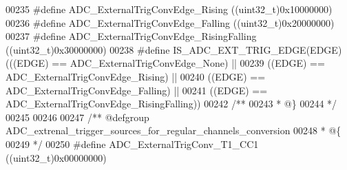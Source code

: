 \begin{DoxyCode}
00235 \textcolor{preprocessor}{#}\textcolor{preprocessor}{define} \textcolor{preprocessor}{ADC\_ExternalTrigConvEdge\_Rising}        \textcolor{preprocessor}{(}\textcolor{preprocessor}{(}\textcolor{preprocessor}{uint32\_t}\textcolor{preprocessor}{)}0x10000000\textcolor{preprocessor}{)}
00236 \textcolor{preprocessor}{#}\textcolor{preprocessor}{define} \textcolor{preprocessor}{ADC\_ExternalTrigConvEdge\_Falling}       \textcolor{preprocessor}{(}\textcolor{preprocessor}{(}\textcolor{preprocessor}{uint32\_t}\textcolor{preprocessor}{)}0x20000000\textcolor{preprocessor}{)}
00237 \textcolor{preprocessor}{#}\textcolor{preprocessor}{define} \textcolor{preprocessor}{ADC\_ExternalTrigConvEdge\_RisingFalling} \textcolor{preprocessor}{(}\textcolor{preprocessor}{(}\textcolor{preprocessor}{uint32\_t}\textcolor{preprocessor}{)}0x30000000\textcolor{preprocessor}{)}
00238 \textcolor{preprocessor}{#}\textcolor{preprocessor}{define} \textcolor{preprocessor}{IS\_ADC\_EXT\_TRIG\_EDGE}\textcolor{preprocessor}{(}\textcolor{preprocessor}{EDGE}\textcolor{preprocessor}{)} \textcolor{preprocessor}{(}\textcolor{preprocessor}{(}\textcolor{preprocessor}{(}\textcolor{preprocessor}{EDGE}\textcolor{preprocessor}{)} \textcolor{preprocessor}{==} 
      ADC_ExternalTrigConvEdge_None\textcolor{preprocessor}{)} \textcolor{preprocessor}{||}
00239                              \textcolor{preprocessor}{(}\textcolor{preprocessor}{(}\textcolor{preprocessor}{EDGE}\textcolor{preprocessor}{)} \textcolor{preprocessor}{==} ADC_ExternalTrigConvEdge_Rising\textcolor{preprocessor}{)} \textcolor{preprocessor}{||}
00240                              \textcolor{preprocessor}{(}\textcolor{preprocessor}{(}\textcolor{preprocessor}{EDGE}\textcolor{preprocessor}{)} \textcolor{preprocessor}{==} ADC_ExternalTrigConvEdge_Falling\textcolor{preprocessor}{)} \textcolor{preprocessor}{||}
00241                              \textcolor{preprocessor}{(}\textcolor{preprocessor}{(}\textcolor{preprocessor}{EDGE}\textcolor{preprocessor}{)} \textcolor{preprocessor}{==} 
      ADC_ExternalTrigConvEdge_RisingFalling\textcolor{preprocessor}{)}\textcolor{preprocessor}{)}
00242 \textcolor{comment}{/**}
00243 \textcolor{comment}{  * @\}}
00244 \textcolor{comment}{  */}
00245 
00246 
00247 \textcolor{comment}{/** @defgroup ADC\_extrenal\_trigger\_sources\_for\_regular\_channels\_conversion }
00248 \textcolor{comment}{  * @\{}
00249 \textcolor{comment}{  */}
00250 \textcolor{preprocessor}{#}\textcolor{preprocessor}{define} \textcolor{preprocessor}{ADC\_ExternalTrigConv\_T1\_CC1}                \textcolor{preprocessor}{(}\textcolor{preprocessor}{(}\textcolor{preprocessor}{uint32\_t}\textcolor{preprocessor}{)}0x00000000\textcolor{preprocessor}{)}

\end{DoxyCode}
